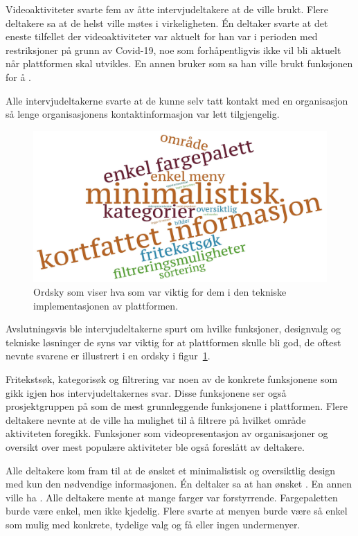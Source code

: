 Videoaktiviteter svarte fem av åtte intervjudeltakere at de ville brukt. Flere deltakere sa at de helst ville møtes i virkeligheten. Én deltaker svarte at det eneste tilfellet der videoaktiviteter var aktuelt for han var i perioden med restriksjoner på grunn av Covid-19, noe som forhåpentligvis ikke vil bli aktuelt når plattformen skal utvikles. En annen bruker som sa han ville brukt funksjonen for å .

Alle intervjudeltakerne svarte at de kunne selv tatt kontakt med en organisasjon så lenge organisasjonens kontaktinformasjon var lett tilgjengelig.

\begin{figure}[H]
\includegraphics[width=\textwidth]{Illustrasjoner/ordsky-funksjoner.jpg}
\caption{Ordsky som viser hva som var viktig for dem i den tekniske implementasjonen av plattformen.}
\label{fig:ordsky-funksjoner}
\end{figure}

Avslutningsvis ble intervjudeltakerne spurt om hvilke funksjoner, designvalg og tekniske løsninger de syns var viktig for at plattformen skulle bli god, de oftest nevnte svarene er illustrert i en ordsky i figur~\ref{fig:ordsky-funksjoner}. 

Fritekstsøk, kategorisøk og filtrering var noen av de konkrete funksjonene som gikk igjen hos intervjudeltakernes svar. Disse funksjonene ser også prosjektgruppen på som de mest grunnleggende funksjonene i plattformen. Flere deltakere nevnte at de ville ha mulighet til å filtrere på hvilket område aktiviteten foregikk. Funksjoner som videopresentasjon av organisasjoner og oversikt over mest populære aktiviteter ble også foreslått av deltakere.

Alle deltakere kom fram til at de ønsket et minimalistisk og oversiktlig design med kun den nødvendige informasjonen. Én deltaker sa at han ønsket . En annen ville ha . Alle deltakere mente at mange farger var forstyrrende. Fargepaletten burde være enkel, men ikke kjedelig. Flere svarte at menyen burde være så enkel som mulig med konkrete, tydelige valg og få eller ingen undermenyer.

